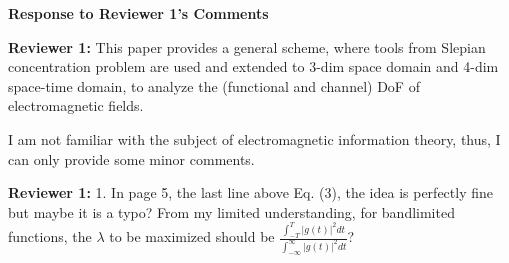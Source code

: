 \documentclass[a4paper,12pt]{article}
\begin{document}
\clearpage


\begin{center}
    {\Large\bf Response to Reviewer 1's Comments}
\end{center}

{\textbf{Reviewer 1:}}
This paper provides a general scheme, where tools from Slepian concentration problem are used and extended to 3-dim space domain and 4-dim space-time domain, to analyze the (functional and channel) DoF of electromagnetic fields.

\quad I am not familiar with the subject of electromagnetic information theory, thus, I can only provide some minor comments.

{}

\textbf{Reviewer 1:}
1. In page 5, the last line above Eq. (3), the idea is perfectly fine but maybe it is a typo? From my limited understanding, for bandlimited functions, the $\lambda$ to be maximized should be
$\frac{\int_{-T}^T|g(t)|^2dt}{\int_{-\infty}^\infty|g(t)|^2dt}$?
\end{document}
